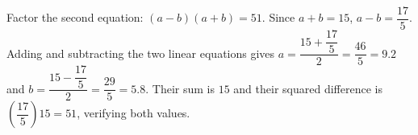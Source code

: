 Factor the second equation: $(a-b)(a+b)=51$. Since $a+b=15$, $a-b=\dfrac{17}{5}$. Adding and subtracting the two linear equations gives $a=\dfrac{15+\dfrac{17}{5}}{2}=\dfrac{46}{5}=9.2$ and $b=\dfrac{15-\dfrac{17}{5}}{2}=\dfrac{29}{5}=5.8$. Their sum is $15$ and their squared difference is $(\dfrac{17}{5})15=51$, verifying both values.
